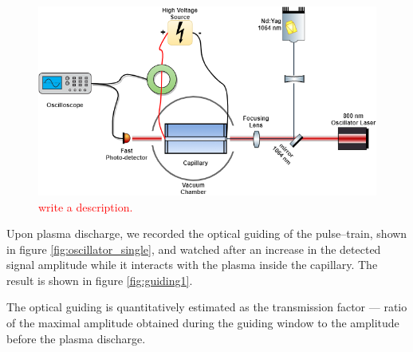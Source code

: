 \documentclass[../main.tex]{subfiles}
\begin{document}
\begin{figure}
\centering \includegraphics[width=\textwidth]{figures/oscillator.png}
\caption{\textcolor{red}{write a description.}}
\label{fig:oscillator}
\end{figure}
Upon plasma discharge, we recorded the optical guiding of the pulse--train, shown in figure \ref{fig:oscillator_single}, and watched after an increase in the detected signal amplitude while it interacts with the plasma inside the capillary. The result is shown in figure \ref{fig:guiding1}.

The optical guiding is quantitatively estimated as the transmission factor --- ratio of the maximal amplitude obtained during the guiding window to the amplitude before the plasma discharge.
\end{document}

